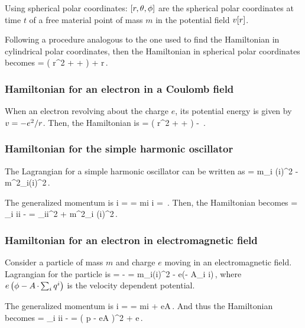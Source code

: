 Using spherical polar coordinates: $\left[{r,\theta,\phi}\right]$ are the spherical polar coordinates at time $t$ of a free material point of mass $m$ in the potential field $v\!\left[{r}\right]$.

Following a procedure analogous to the one used to find the Hamiltonian in cylindrical polar coordinates, then the Hamiltonian in spherical polar coordinates becomes
\beq
\ham = \left( \gmom r^2 +  +  \right) + \pen\vat r\,.
\eeq


\subsubsection{Hamiltonian for an electron in a Coulomb field}
When an electron revolving about the charge $e$, its potential energy is given by $v = -e^2/r$. Then, the Hamiltonian is
\beq
\ham = \left( \gmom r^2 +  +  \right) -  \,.
\eeq


\subsubsection{Hamiltonian for the simple harmonic oscillator}
The Lagrangian for a simple harmonic oscillator can be written as
\beq
\lag = m\sum_i (\gvel i)^2 - m\omega^2\sum_i(\gpos i)^2\,.
\eeq

The generalized momentum is
\beq
\gmom i =  
        = m\gvel i \implies \gvel i = \,.
\eeq
Then, the Hamiltonian becomes
\beq
\ham = \sum_i \gmom i\gvel i - \lag 
     = \sum_i\gmom i^2 + m\omega^2\sum_i (\gpos i)^2\,.
\eeq


\subsubsection{Hamiltonian for an electron in electromagnetic field}
Consider a particle of mass $m$ and charge $e$ moving in an electromagnetic field. Lagrangian for the particle is
\beq
\lag = \ken - \pen
     = m\sum_i(\gvel i)^2 - e\left(\phi - A\iprod \sum_i \gpos i\right)\,,
\eeq
where $e\left(\phi - A\operatorname{\cdot} \sum_i {q}^{i}\right)$ is the velocity dependent potential.

The generalized momentum is
\beq
\gmom i = 
        = m\gvel i + eA\,.
\eeq
And thus the Hamiltonian becomes
\beq
\ham = \sum_i \gmom i\gvel i - \lag 
     = \left( p - eA \right)^2 + e\phi\,.
\eeq


